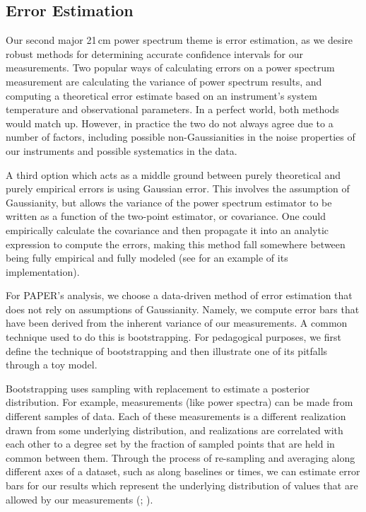 \documentclass[preprint2,numberedappendix,tighten]{aastex6}
\begin{document}

\subsection{Error Estimation}
\label{sec:ErrorOverview}

Our second major 21\,cm power spectrum theme is error estimation, as we desire robust methods for determining accurate 
confidence intervals for our measurements. Two popular ways of calculating errors on a power spectrum 
measurement are calculating the variance of power spectrum results, and computing a theoretical error estimate based on an instrument's 
system temperature and observational parameters. In a perfect world, both methods would match up. However, in practice the 
two do not always agree due to a number of factors, including possible non-Gaussianities in the noise properties of our instruments and possible systematics in the data.

A third option which acts as a middle ground between purely theoretical and purely empirical errors is using Gaussian error. This involves the assumption of Gaussianity, but allows the variance of the power spectrum estimator to be written as a function of the two-point estimator, or covariance. One could empirically calculate the covariance and then propagate it into an analytic expression to compute the errors, making this method fall somewhere between being fully empirical and fully modeled (see \citet{das_et_al2011a} for an example of its implementation). 

For PAPER's analysis, we choose a data-driven method of error estimation that does not rely on assumptions of Gaussianity. Namely, we compute error bars that have been derived from the inherent 
variance of our measurements. A common technique used to do this is bootstrapping. For pedagogical purposes, we first define the technique of 
bootstrapping and then illustrate one of its pitfalls through a toy model.

Bootstrapping uses sampling with replacement to estimate a posterior distribution. For example, measurements (like power 
spectra) can be made from different samples of data. Each of these measurements is a different realization drawn from some underlying distribution, and realizations are correlated with each other to a degree set by the fraction of sampled points that are held in common 
between them. Through the process of re-sampling and averaging along different axes of a dataset, such as along baselines or times, we can estimate error bars for 
our results which represent the underlying distribution of values that are allowed by our measurements (\citealt{efron_tibshirani1994}; \citealt{andrae2010}).
\end{document}
